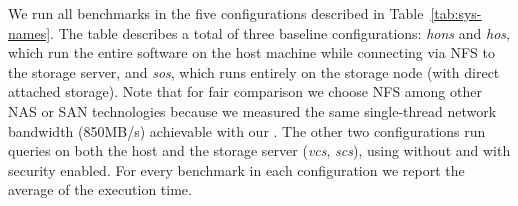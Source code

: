 We run all benchmarks in the five configurations described in Table~\ref{tab:sys-names}.
The table describes a total of three baseline configurations: \emph{hons} and \emph{hos}, which run the entire software on the host machine while connecting via NFS to the storage server, 
and \emph{sos}, which runs entirely on the storage node (with direct attached storage). 
Note that for fair comparison we choose NFS among other NAS or SAN technologies because we measured the same single-thread network bandwidth (850MB/s) achievable with our \project{}. 
The other two configurations run queries on both the host and the storage server (\emph{vcs}, \emph{scs}), using \project{} without and with security enabled.
For every benchmark in each configuration we report the average of the execution time.%





